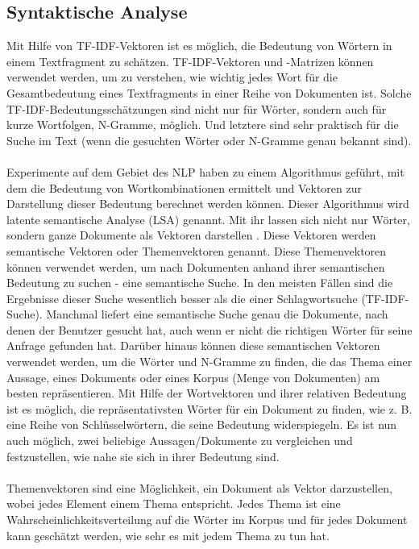 \subsection{Syntaktische Analyse}
Mit Hilfe von \ac{TF-IDF}-Vektoren ist es möglich, die Bedeutung von Wörtern in einem Textfragment zu schätzen. 
\ac{TF-IDF}-Vektoren und -Matrizen können verwendet werden, um zu verstehen, wie wichtig jedes Wort für die Gesamtbedeutung eines Textfragments in einer Reihe von Dokumenten ist. 
Solche \ac{TF-IDF}-Bedeutungsschätzungen sind nicht nur für Wörter, sondern auch für kurze Wortfolgen, N-Gramme, möglich. 
Und letztere sind sehr praktisch für die Suche im Text (wenn die gesuchten Wörter oder N-Gramme genau bekannt sind).\\\\
Experimente auf dem Gebiet des \ac{NLP} haben zu einem Algorithmus geführt, mit dem die Bedeutung von Wortkombinationen ermittelt und Vektoren zur Darstellung dieser Bedeutung berechnet werden können. 
Dieser Algorithmus wird latente semantische Analyse (\ac{LSA}) genannt. 
Mit ihr lassen sich nicht nur Wörter, sondern ganze Dokumente als Vektoren darstellen \cite{rygl_semantic_2017}.
Diese Vektoren werden semantische Vektoren oder Themenvektoren genannt. 
Diese Themenvektoren können verwendet werden, um nach Dokumenten anhand ihrer semantischen Bedeutung zu suchen - eine semantische Suche. 
In den meisten Fällen sind die Ergebnisse dieser Suche wesentlich besser als die einer Schlagwortsuche (\ac{TF-IDF}-Suche). 
Manchmal liefert eine semantische Suche genau die Dokumente, nach denen der Benutzer gesucht hat, auch wenn er nicht die richtigen Wörter für seine Anfrage gefunden hat. 
Darüber hinaus können diese semantischen Vektoren verwendet werden, um die Wörter und N-Gramme zu finden, die das Thema einer Aussage, eines Dokuments oder eines Korpus (Menge von Dokumenten) am besten repräsentieren. 
Mit Hilfe der Wortvektoren und ihrer relativen Bedeutung ist es möglich, die repräsentativsten Wörter für ein Dokument zu finden, wie z. B. eine Reihe von Schlüsselwörtern, die seine Bedeutung widerspiegeln. 
Es ist nun auch möglich, zwei beliebige Aussagen/Dokumente zu vergleichen und festzustellen, wie nahe sie sich in ihrer Bedeutung sind.\\\\
Themenvektoren sind eine Möglichkeit, ein Dokument als Vektor darzustellen, wobei jedes Element einem Thema entspricht. 
Jedes Thema ist eine Wahrscheinlichkeitsverteilung auf die Wörter im Korpus und für jedes Dokument kann geschätzt werden, wie sehr es mit jedem Thema zu tun hat.

